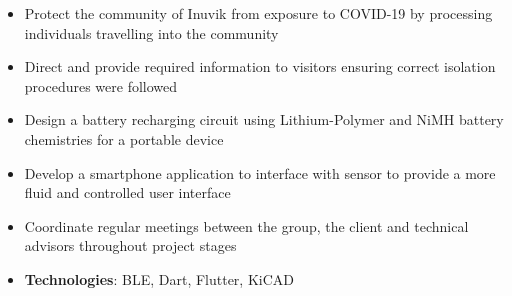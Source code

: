 \documentclass[10pt, letterpaper, ragged2e, withhyper]{altacv}
\begin{document}
\begin{paracol}{2}
            \divider
            
            \begin{itemize}
                \item Protect the community of Inuvik from exposure to COVID-19 by processing individuals travelling into the community 
                \item Direct and provide required information to visitors ensuring correct isolation procedures were followed
            \end{itemize}

            
    
    \begin{itemize}
        \item Design a battery recharging circuit using Lithium-Polymer and NiMH battery chemistries for a portable device 
        \item Develop a smartphone application to interface with sensor to provide a more fluid and 
        controlled user interface
        \item Coordinate regular meetings between the group, the client and technical advisors throughout project stages   
        \item \textbf{Technologies}: BLE, Dart, Flutter, KiCAD
    \end{itemize}

\switchcolumn

     \\
    

\end{paracol}
\end{document}
